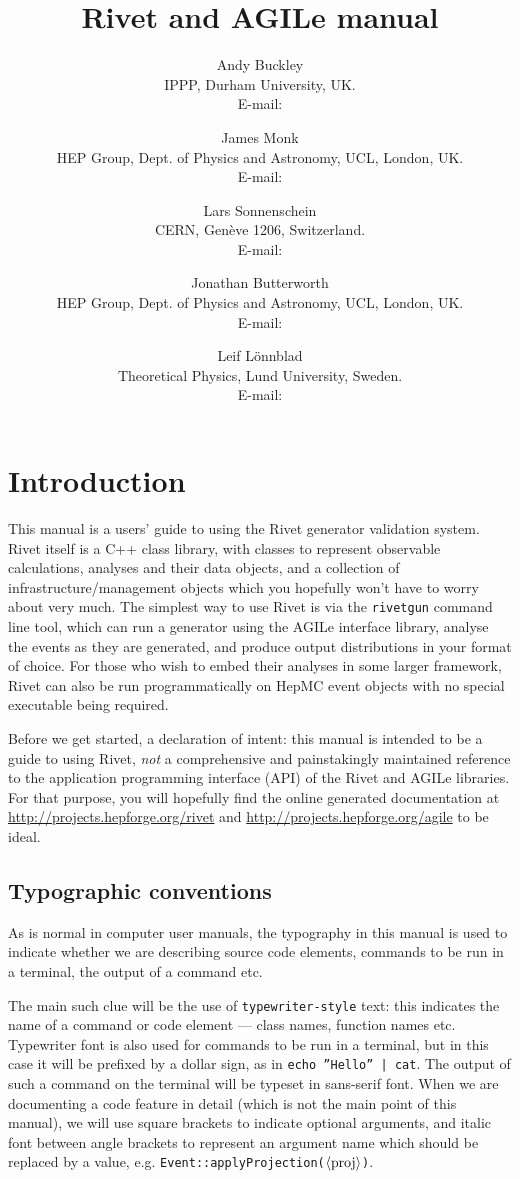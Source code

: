 \documentclass{JHEP3}
\title{Rivet and AGILe manual}
\author{Andy Buckley\\ IPPP, Durham University, UK.\\ E-mail: \email{andy.buckley@durham.ac.uk}}
\author{James Monk\\ HEP Group, Dept. of Physics and Astronomy, UCL, London, UK.\\ E-mail: \email{jmonk@hep.ucl.ac.uk}}
\author{Lars Sonnenschein\\ CERN, Gen\`eve 1206, Switzerland.\\ E-mail: \email{sonne@cern.ch}}
\author{Jonathan Butterworth\\ HEP Group, Dept. of Physics and Astronomy, UCL, London, UK.\\ E-mail: \email{J.Butterworth@ucl.ac.uk}}
\author{Leif L\"onnblad\\ Theoretical Physics, Lund University, Sweden.\\ E-mail: \email{lonnblad@thep.lu.se}}
\newcommand{\kbd}[1]{\texttt{#1}\xspace}
\newcommand{\inp}[1]{\textsf{\textdollar}\hspace{1mm}\texttt{#1}\xspace}
\newcommand{\outp}[1]{\textsf{#1}\xspace}
\newcommand{\code}[1]{\texttt{#1}\xspace}
\newcommand{\val}[1]{\textit{\ensuremath{\langle\text{\textrm{#1}\/}\rangle}}\xspace}
\begin{document}
 


\section{Introduction}
This manual is a users' guide to using the Rivet generator validation
system. Rivet itself is a C++ class library, with classes to represent
observable calculations, analyses and their data objects, and a collection of
infrastructure/management objects which you hopefully won't have to worry about
very much. The simplest way to use Rivet is via the \kbd{rivetgun} command line
tool, which can run a generator using the AGILe interface library, analyse the
events as they are generated, and produce output distributions in your format of
choice. For those who wish to embed their analyses in some larger framework,
Rivet can also be run programmatically on HepMC event objects with no special
executable being required.

Before we get started, a declaration of intent: this manual is intended to be a
guide to using Rivet, \emph{not} a comprehensive and painstakingly maintained
reference to the application programming interface (API) of the Rivet and AGILe
libraries. For that purpose, you will hopefully find the online generated
documentation at \url{http://projects.hepforge.org/rivet} and
\url{http://projects.hepforge.org/agile} to be ideal.

\subsection{Typographic conventions}
As is normal in computer user manuals, the typography in this manual is used to
indicate whether we are describing source code elements, commands to be run in a
terminal, the output of a command etc.

The main such clue will be the use of \kbd{typewriter-style} text: this
indicates the name of a command or code element --- class names, function names
etc. Typewriter font is also used for commands to be run in a terminal, but in
this case it will be prefixed by a dollar sign, as in \inp{echo ''Hello'' |
  cat}.  The output of such a command on the terminal will be typeset in
\outp{sans-serif} font. When we are documenting a code feature in detail (which
is not the main point of this manual), we will use square brackets to indicate
optional arguments, and italic font between angle brackets to represent an
argument name which should be replaced by a value,
e.g. \code{Event::applyProjection(\val{proj})}.
\end{document}
